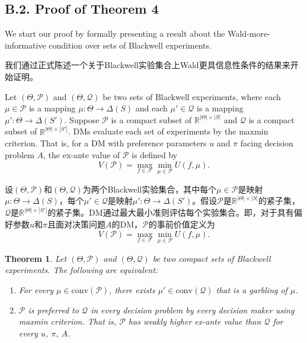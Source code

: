 \documentclass[12pt,a4paper]{article}
\newenvironment{original}
  {\par\vspace{4pt}\noindent\color{black}\ignorespaces}
  {\par\vspace{2pt}}
\newenvironment{translation}
  {\par\vspace{2pt}\noindent\color{myblue}\ignorespaces}
  {\par\vspace{6pt}}
\newcommand{\bisubsection}[2]{%
  \subsection{#1}%
  \vspace{-2pt}%
  \noindent{\color{myblue}\bfseries #2}%
  \vspace{4pt}%
}
\newtheorem{theorem}{Theorem}[section]
\newcommand{\R}{\mathbb{R}}
\newcommand{\Delt}{\Delta}
\newcommand{\calF}{\mathcal{F}}
\newcommand{\conv}{\mathrm{conv}}
\begin{document}

\bisubsection{B.2. Proof of Theorem 4}{B.2. 定理4的证明}

\begin{original}
We start our proof by formally presenting a result about the Wald-more-informative condition over sets of Blackwell experiments.
\end{original}

\begin{translation}
我们通过正式陈述一个关于Blackwell实验集合上Wald更具信息性条件的结果来开始证明。
\end{translation}

\begin{original}
Let $(\Theta,\mathcal{P})$ and $(\Theta,\mathcal{Q})$ be two sets of Blackwell experiments, where each $\mu\in\mathcal{P}$ is a mapping $\mu:\Theta\to\Delt(S)$ and each $\mu'\in\mathcal{Q}$ is a mapping $\mu':\Theta\to\Delt(S')$. Suppose $\mathcal{P}$ is a compact subset of $\R^{|\Theta|\times|S|}$ and $\mathcal{Q}$ is a compact subset of $\R^{|\Theta|\times|S'|}$. DMs evaluate each set of experiments by the maxmin criterion. That is, for a DM with preference parameters $u$ and $\pi$ facing decision problem $A$, the ex-ante value of $\mathcal{P}$ is defined by
\begin{equation}
    V(\mathcal{P}) = \max_{f\in\calF} \min_{\mu\in\mathcal{P}} U(f, \mu).
\end{equation}
\end{original}

\begin{translation}
设$(\Theta,\mathcal{P})$和$(\Theta,\mathcal{Q})$为两个Blackwell实验集合，其中每个$\mu\in\mathcal{P}$是映射$\mu:\Theta\to\Delt(S)$，每个$\mu'\in\mathcal{Q}$是映射$\mu':\Theta\to\Delt(S')$。假设$\mathcal{P}$是$\R^{|\Theta|\times|S|}$的紧子集，$\mathcal{Q}$是$\R^{|\Theta|\times|S'|}$的紧子集。DM通过最大最小准则评估每个实验集合。即，对于具有偏好参数$u$和$\pi$且面对决策问题$A$的DM，$\mathcal{P}$的事前价值定义为
\begin{equation}
    V(\mathcal{P}) = \max_{f\in\calF} \min_{\mu\in\mathcal{P}} U(f, \mu).
\end{equation}
\end{translation}

\begin{theorem}
Let $(\Theta,\mathcal{P})$ and $(\Theta,\mathcal{Q})$ be two compact sets of Blackwell experiments. The following are equivalent:
\begin{enumerate}
    \item For every $\mu\in\conv(\mathcal{P})$, there exists $\mu'\in\conv(\mathcal{Q})$ that is a garbling of $\mu$.
    \item $\mathcal{P}$ is preferred to $\mathcal{Q}$ in every decision problem by every decision maker using maxmin criterion. That is, $\mathcal{P}$ has weakly higher ex-ante value than $\mathcal{Q}$ for every $u$, $\pi$, $A$.
\end{enumerate}
\end{theorem}
\end{document}
